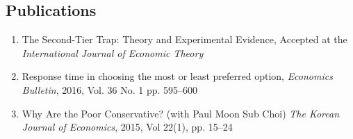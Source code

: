 \documentclass[margin]{res}
\begin{document}
\begin{resume}
\section{Publications}
\begin{enumerate}
\item The Second-Tier Trap: Theory and Experimental Evidence, Accepted at the \emph{International Journal of Economic Theory}
\item Response time in choosing the most or least preferred option, \textit{Economics Bulletin}, 2016, Vol. 36 No. 1 pp. 595--600
\item Why Are the Poor Conservative? (with Paul Moon Sub Choi) \textit{The Korean Journal of Economics}, 2015, Vol 22(1), pp. 15--24
\end{enumerate}

%


\end{resume}
\end{document}
